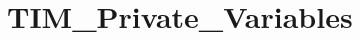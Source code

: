 \hypertarget{group___t_i_m___private___variables}{}\section{T\+I\+M\+\_\+\+Private\+\_\+\+Variables}
\label{group___t_i_m___private___variables}
